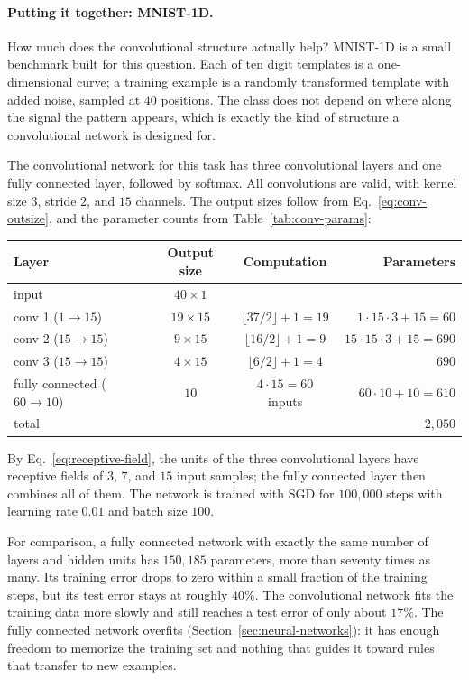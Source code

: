 \paragraph{Putting it together: MNIST-1D.}
How much does the convolutional structure actually help? MNIST-1D is a small
benchmark built for this question. Each of ten digit templates is a
one-dimensional curve; a training example is a randomly transformed template
with added noise, sampled at $40$ positions. The class does not depend on where
along the signal the pattern appears, which is exactly the kind of structure a
convolutional network is designed for.

The convolutional network for this task has three convolutional layers and one fully connected layer,
followed by softmax. All convolutions are valid, with kernel size $3$, stride
$2$, and $15$ channels. The output sizes follow from
Eq.~\eqref{eq:conv-outsize}, and the parameter counts from
Table~\ref{tab:conv-params}:
\begin{center}
  \begin{tabular}{@{}lccr@{}}
    \toprule
    Layer & Output size & Computation & Parameters \\
    \midrule
    input & $40\times1$ & & \\
    conv 1 ($1\rightarrow15$) & $19\times15$ &
      $\lfloor 37/2\rfloor+1 = 19$ & $1\cdot15\cdot3+15 = 60$ \\
    conv 2 ($15\rightarrow15$) & $9\times15$ &
      $\lfloor 16/2\rfloor+1 = 9$ & $15\cdot15\cdot3+15 = 690$ \\
    conv 3 ($15\rightarrow15$) & $4\times15$ &
      $\lfloor 6/2\rfloor+1 = 4$ & $690$ \\
    fully connected ($60\rightarrow10$) & $10$ & $4\cdot15 = 60$ inputs &
      $60\cdot10+10 = 610$ \\
    \midrule
    total & & & $2{,}050$ \\
    \bottomrule
  \end{tabular}
\end{center}
\noindent
By Eq.~\eqref{eq:receptive-field}, the units of the three convolutional layers
have receptive fields of $3$, $7$, and $15$ input samples; the fully connected
layer then combines all of them. The network is trained with SGD for $100{,}000$
steps with learning rate $0.01$ and batch size $100$.

For comparison, a fully connected network with exactly the same number of layers and hidden
units has $150{,}185$ parameters, more than seventy times as many. Its training
error drops to zero within a small fraction of the training steps, but its test
error stays at roughly $40\%$. The convolutional network fits the training data
more slowly and still reaches a test error of only about $17\%$. The fully
connected network overfits (Section~\ref{sec:neural-networks}): it has enough
freedom to memorize the training set and nothing that guides it toward rules
that transfer to new examples.

